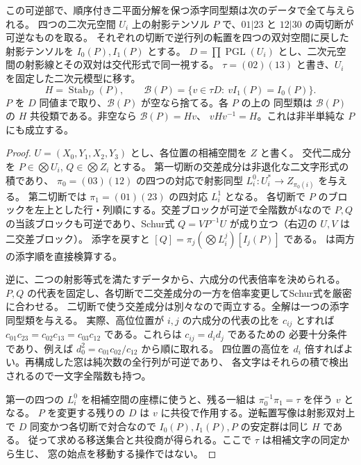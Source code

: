 \begin{theorem}\label{thm:split-inverse-transporter}
この可逆部で、順序付き二平面分解を保つ添字同型類は次のデータで全て与えられる。
四つの二次元空間 $U_i$ 上の射影テンソル $P$ で、$01|23$ と $12|30$ の両切断が可逆なものを取る。
それぞれの切断で逆行列の転置を四つの双対空間に戻した射影テンソルを $I_0(P),I_1(P)$ とする。
$D=\prod\operatorname{PGL}(U_i)$ とし、二次元空間の射影線とその双対は交代形式で同一視する。
$\tau=(02)(13)$ と書き、$U_i$ を固定した二次元模型に移す。
\[
  H=\operatorname{Stab}_D(P),\qquad
  \mathcal B(P)=\{v\in \tau D:\ v I_1(P)=I_0(P)\}.
\]
$P$ を $D$ 同値まで取り、$\mathcal B(P)$ が空なら捨てる。各 $P$ の上の
同型類は $\mathcal B(P)$ の $H$ 共役類である。非空なら $\mathcal B(P)=Hv$、
$vHv^{-1}=H$。これは非半単純な $P$ にも成立する。
\end{theorem}
\begin{proof}
$U=(X_0,Y_1,X_2,Y_3)$ とし、各位置の相補空間を $Z$ と書く。
交代二成分を $P\in\bigotimes U_i$, $Q\in\bigotimes Z_i$ とする。
第一切断の交差成分は非退化な二文字形式の積であり、
$\pi_0=(03)(12)$ の四つの対応で射影同型 $L_i^0:U_i^*\to Z_{\pi_0(i)}$ を与える。
第二切断では $\pi_1=(01)(23)$ の四対応 $L_i^1$ となる。
各切断で $P$ のブロックを左上とした行・列順にする。交差ブロックが可逆で全階数が4なので
$P,Q$ の当該ブロックも可逆であり、Schur式 $Q=V P^{-1}U$ が成り立つ（右辺の $U,V$ は二交差ブロック）。
添字を戻すと $[Q]=\pi_j(\bigotimes L_i^j)[I_j(P)]$ である。
 は両方の添字順を直接検算する。

逆に、二つの射影等式を満たすデータから、六成分の代表倍率を決められる。
$P,Q$ の代表を固定し、各切断で二交差成分の一方を倍率変更してSchur式を厳密に合わせる。
二切断で使う交差成分は別々なので両立する。全解は一つの添字同型類を与える。
実際、高位位置が $i,j$ の六成分の代表の比を $c_{ij}$ とすれば
$c_{01}c_{23}=c_{02}c_{13}=c_{03}c_{12}$ である。これらは $c_{ij}=d_i d_j$ であるための
必要十分条件であり、例えば $d_0^2=c_{01}c_{02}/c_{12}$ から順に取れる。
四位置の高位を $d_i$ 倍すればよい。再構成した窓は純次数の全行列が可逆であり、
各文字はそれらの積で検出されるので一文字全階数も持つ。

第一の四つの $L_i^0$ を相補空間の座標に使うと、残る一組は
$\pi_0^{-1}\pi_1=\tau$ を伴う $v$ となる。
$P$ を変更する残りの $D$ は $v$ に共役で作用する。逆転置写像は射影双対上で
$D$ 同変かつ各切断で対合なので $I_0(P),I_1(P),P$ の安定群は同じ $H$ である。
従って求める移送集合と共役商が得られる。ここで $\tau$ は相補文字の同定から生じ、
窓の始点を移動する操作ではない。
\end{proof}

